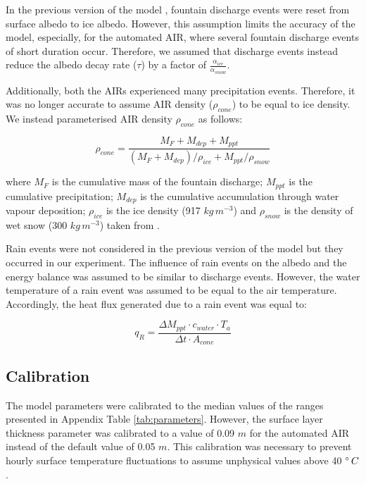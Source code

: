 \documentclass[tc, manuscript]{copernicus}
\begin{document}
In the previous version of the model \citep{balasubramanianInfluenceMeteorologicalConditions2022}, fountain
discharge events were reset from surface albedo to ice albedo. However, this assumption limits the accuracy of
the model, especially, for the automated AIR, where several fountain discharge events of short duration occur.
Therefore, we assumed that discharge events instead reduce the albedo decay rate ($\tau$) by a 
factor of $\frac{\alpha_{ice}}{\alpha_{snow}}$.

Additionally, both the AIRs experienced many precipitation events. Therefore, it was no longer accurate to
assume AIR density ($\rho_{cone}$) to be equal to ice density. We instead parameterised AIR density $\rho_{cone}$ as follows:

\begin{equation}
  \rho_{cone} = \frac{M_{F} + M_{dep} + M_{ppt}}{(M_{F} + M_{dep})/\rho_{ice} + M_{ppt}/\rho_{snow}}
\end{equation}

where $M_F$ is the cumulative mass of the fountain discharge; $M_{ppt}$ is the cumulative precipitation;
$M_{dep}$ is the cumulative accumulation through water vapour deposition; $\rho_{ice}$ is the ice density (917
$kg\,m^{-3}$) and $\rho_{snow}$ is the density of wet snow (300 $kg\,m^{-3}$) taken from
\cite{cuffeyPhysicsGlaciers2010} .

Rain events were not considered in the previous version of the model but they occurred in our experiment. The
influence of rain events on the albedo and the energy balance was assumed to be similar to discharge
events. However, the water temperature of a rain event was assumed to be equal to the air temperature.
Accordingly, the heat flux generated due to a rain event was equal to:

\begin{equation}
  q_{R} = \frac{\Delta M_{ppt} \cdot c_{water} \cdot T_{a}}{\Delta t \cdot A_{cone}}
\end{equation}

\subsection{Calibration}

The model parameters were calibrated to the median values of the ranges presented in Appendix Table
\ref{tab:parameters}. However, the surface layer thickness parameter was calibrated to a value of 0.09 $m$ for the
automated AIR instead of the default value of 0.05 $m$. This calibration was necessary to prevent hourly surface
temperature fluctuations to assume unphysical values above 40 $^{\circ}\,C$.
\end{document}
